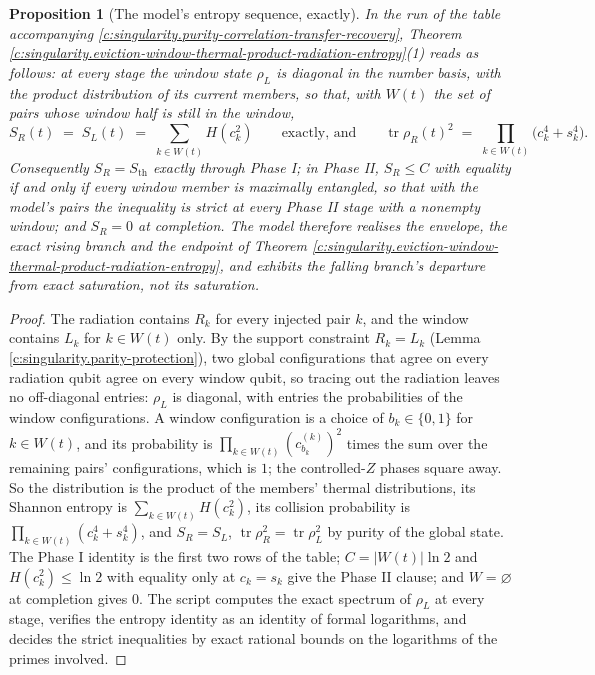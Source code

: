 \documentclass[11pt]{article}
\newtheorem{proposition}[theorem]{Proposition}
\theoremstyle{definition}
\theoremstyle{plain}
\providecommand{\Sth}{}\renewcommand{\Sth}{S_{\mathrm{th}}}
\providecommand{\tr}{}\renewcommand{\tr}{\operatorname{tr}}
\begin{document}
\begin{proposition}[The model's entropy sequence, exactly]\label{c:singularity.models-entropy-sequence-exactly}
In the run of the table accompanying \ref{c:singularity.purity-correlation-transfer-recovery}, Theorem \ref{c:singularity.eviction-window-thermal-product-radiation-entropy}(1) reads as follows: at every stage the window state $\rho_L$ is diagonal in the number basis, with the product distribution of its current members, so that, with $W(t)$ the set of pairs whose window half is still in the window,
\[
S_R(t) \;=\; S_L(t) \;=\; \sum_{k \in W(t)} H(c_k^{2}) \qquad \text{exactly, and} \qquad \tr\rho_R(t)^{2} \;=\; \prod_{k \in W(t)}\bigl(c_k^{4} + s_k^{4}\bigr) .
\]
Consequently $S_R = \Sth$ exactly through Phase I; in Phase II, $S_R \leq C$ with equality if and only if every window member is maximally entangled, so that with the model's pairs the inequality is strict at every Phase II stage with a nonempty window; and $S_R = 0$ at completion. The model therefore realises the envelope, the exact rising branch and the endpoint of Theorem \ref{c:singularity.eviction-window-thermal-product-radiation-entropy}, and exhibits the falling branch's departure from exact saturation, not its saturation.
\end{proposition}
\begin{proof}
The radiation contains $R_k$ for every injected pair $k$, and the window contains $L_k$ for $k \in W(t)$ only. By the support constraint $R_k = L_k$ (Lemma \ref{c:singularity.parity-protection}), two global configurations that agree on every radiation qubit agree on every window qubit, so tracing out the radiation leaves no off-diagonal entries: $\rho_L$ is diagonal, with entries the probabilities of the window configurations. A window configuration is a choice of $b_k \in \{0, 1\}$ for $k \in W(t)$, and its probability is $\prod_{k \in W(t)}(c^{(k)}_{b_k})^{2}$ times the sum over the remaining pairs' configurations, which is $1$; the controlled-$Z$ phases square away. So the distribution is the product of the members' thermal distributions, its Shannon entropy is $\sum_{k \in W(t)}H(c_k^{2})$, its collision probability is $\prod_{k \in W(t)}(c_k^{4} + s_k^{4})$, and $S_R = S_L$, $\tr\rho_R^{2} = \tr\rho_L^{2}$ by purity of the global state. The Phase I identity is the first two rows of the table; $C = |W(t)|\ln 2$ and $H(c_k^{2}) \leq \ln 2$ with equality only at $c_k = s_k$ give the Phase II clause; and $W = \varnothing$ at completion gives $0$. The script computes the exact spectrum of $\rho_L$ at every stage, verifies the entropy identity as an identity of formal logarithms, and decides the strict inequalities by exact rational bounds on the logarithms of the primes involved.

\end{proof}
\end{document}
